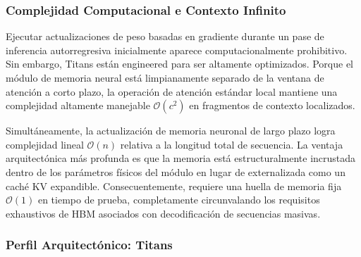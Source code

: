 \documentclass[11pt,a4paper]{article}
\begin{document}
\subsubsection{Complejidad Computacional e Contexto Infinito}

Ejecutar actualizaciones de peso basadas en gradiente durante un pase de inferencia autorregresiva inicialmente aparece computacionalmente prohibitivo. Sin embargo, Titans están engineered para ser altamente optimizados. Porque el módulo de memoria neural está limpianamente separado de la ventana de atención a corto plazo, la operación de atención estándar local mantiene una complejidad altamente manejable $\mathcal{O}(c^2)$ en fragmentos de contexto localizados.

Simultáneamente, la actualización de memoria neuronal de largo plazo logra complejidad lineal $\mathcal{O}(n)$ relativa a la longitud total de secuencia. La ventaja arquitectónica más profunda es que la memoria está estructuralmente incrustada dentro de los parámetros físicos del módulo en lugar de externalizada como un caché KV expandible. Consecuentemente, requiere una huella de memoria fija $\mathcal{O}(1)$ en tiempo de prueba, completamente circunvalando los requisitos exhaustivos de HBM asociados con decodificación de secuencias masivas.

\subsubsection{Perfil Arquitectónico: Titans}
\end{document}
